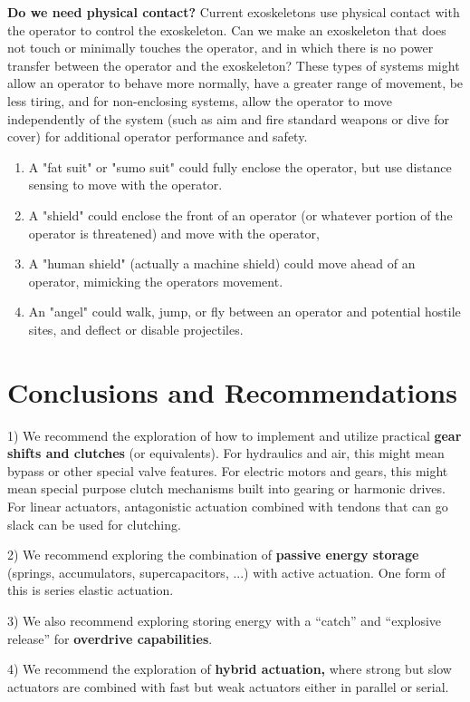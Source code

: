 \documentclass[letterpaper,12pt,fullpage]{article}
\begin{document}
{\bf Do we need physical contact?}
Current exoskeletons use physical contact with the operator to control
the exoskeleton. Can we make an exoskeleton that does not touch or
minimally touches the operator, and in which there is no power
transfer between the operator and the exoskeleton? These types of
systems might allow an operator to behave more normally, have a
greater range of movement, be less tiring, and for non-enclosing
systems, allow the operator to move independently of the system (such
as aim and fire standard weapons or dive for cover) for additional
operator performance and safety.
\begin{enumerate}
\item
A "fat suit" or "sumo suit" could fully enclose the operator, but
use distance sensing to move with the operator.
\item
A "shield" could enclose the front of an operator (or whatever
portion of the operator is threatened) and move with the operator,
\item
A "human shield" (actually a machine shield) could move ahead of
an operator, mimicking the operators movement.
\item
An "angel" could walk, jump, or fly between an operator and potential
hostile sites, and deflect or disable projectiles.
\end{enumerate}

\section{Conclusions and Recommendations}

1) We recommend the exploration of how to implement and utilize practical
{\bf gear shifts and clutches} (or equivalents). For hydraulics and air, this might mean
bypass or other special valve features.
For electric motors and gears, this might mean special purpose clutch mechanisms
built into gearing or harmonic drives. For linear actuators, antagonistic actuation
combined with tendons that can go slack can be used for clutching.

2) We recommend exploring the combination of {\bf passive energy storage} (springs,
accumulators, supercapacitors, ...) with active actuation. One form of this
is series elastic actuation. 

3) We also recommend exploring storing energy with
a ``catch'' and ``explosive release'' for {\bf overdrive capabilities}. 

4) We recommend the exploration of {\bf hybrid actuation,} where strong but slow actuators
are combined with fast but weak actuators either in parallel or serial.
\end{document}
